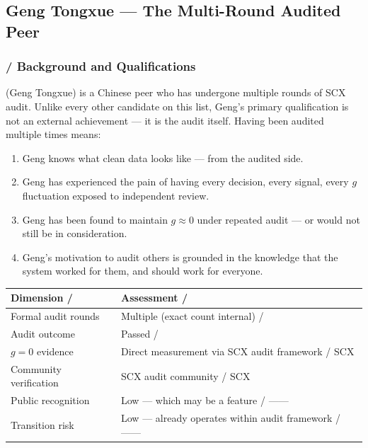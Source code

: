 \documentclass[12pt,a4paper]{article}
\theoremstyle{remark}
\begin{document}
\subsection{Geng Tongxue — The Multi-Round Audited Peer}

\subsubsection{ / Background and Qualifications}

 (Geng Tongxue) is a Chinese peer who has undergone multiple rounds
of SCX audit. Unlike every other candidate on this list, Geng's primary
qualification is not an external achievement — it is the audit itself.
Having been audited multiple times means:

\begin{enumerate}[leftmargin=*]
    \item Geng knows what clean data looks like — from the audited side.
    \item Geng has experienced the pain of having every decision, every
          signal, every $g$ fluctuation exposed to independent review.
    \item Geng has been found to maintain $g \approx 0$ under repeated
          audit — or would not still be in consideration.
    \item Geng's motivation to audit others is grounded in the knowledge
          that the system worked for them, and should work for everyone.
\end{enumerate}

\begin{center}
\begin{tabular}{p{} p{}}
\toprule
\textbf{Dimension / } & \textbf{Assessment / } \\
\midrule
Formal audit rounds & Multiple (exact count internal) /  \\
Audit outcome & Passed /  \\
$g=0$ evidence & Direct measurement via SCX audit framework / SCX \\
Community verification & SCX audit community / SCX \\
Public recognition & Low — which may be a feature / —— \\
Transition risk & Low — already operates within audit framework / —— \\
\bottomrule
\end{tabular}
\end{center}
\end{document}
